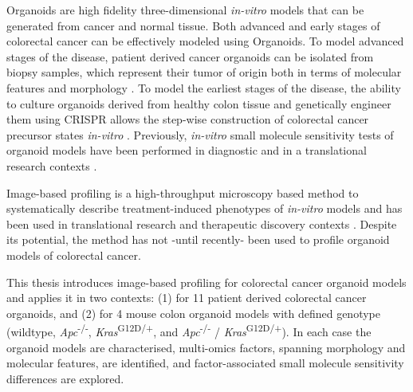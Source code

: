 \begin{flushleft}
Organoids are high fidelity three-dimensional \textit{in-vitro} models that can be generated from cancer and normal tissue. Both advanced and early stages of colorectal cancer can be effectively modeled using Organoids. To model advanced stages of the disease, patient derived cancer organoids can be isolated from biopsy samples, which represent their tumor of origin both in terms of molecular features and morphology \parencite{pauliPersonalizedVitroVivo2017a}. To model the earliest stages of the disease, the ability to culture organoids derived from healthy colon tissue and genetically engineer them using CRISPR allows the step-wise construction of colorectal cancer precursor states \textit{in-vitro} \parencite{matanoModelingColorectalCancer2015a, drostUseCRISPRmodifiedHuman2017}. Previously, \textit{in-vitro} small molecule sensitivity tests of organoid models have been performed in diagnostic and in a translational research contexts \parencite{vandeweteringProspectiveDerivationLiving2015, vlachogiannisPatientderivedOrganoidsModel2018, ganeshRectalCancerOrganoid2019, ooftPatientderivedOrganoidsCan2019, yaoPatientDerivedOrganoidsPredict2020}. 
\par
Image-based profiling is a high-throughput microscopy based method to systematically describe treatment-induced phenotypes of \textit{in-vitro} models and has been used in translational research and therapeutic discovery contexts \parencite{caicedoApplicationsImagebasedProfiling2016}. Despite its potential, the method has not -until recently- \parencite{betgeDruginducedPhenotypicLandscape2022} been used to profile organoid models of colorectal cancer.
\par

This thesis introduces image-based profiling for colorectal cancer organoid models and applies it in two contexts: (1) for 11 patient derived colorectal cancer organoids, and (2) for 4 mouse colon organoid models with defined genotype (wildtype, \textit{Apc}\textsuperscript{-/-}, \textit{Kras}\textsuperscript{G12D/+}, and \textit{Apc}\textsuperscript{-/-} / \textit{Kras}\textsuperscript{G12D/+}). In each case the organoid models are characterised, multi-omics factors, spanning morphology and molecular features, are identified, and factor-associated small molecule sensitivity differences are explored. 
\bigbreak


\end{flushleft}
